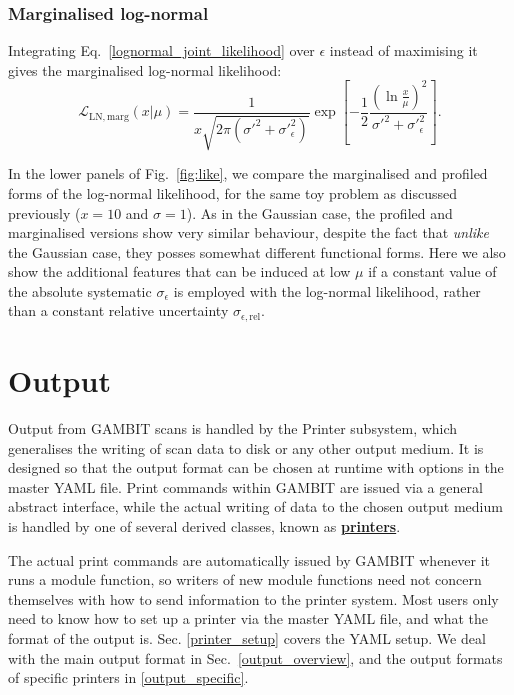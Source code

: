 \documentclass[pdftex,twocolumn,epjc3_preprint,runningheads]{svjour3}
\renewcommand{\_}{\discretionary{\underscore}{}{\underscore}}
\newcommand{\doublecross}[2]{\hyperref[#2]{\textbf{#1}}}
\newcommand{\gambit}{\textsf{GAMBIT}\xspace}
\newcommand{\GB}{\gambit}
\newcommand\YAML{\textsf{YAML}\xspace}
\begin{document}
\subsubsection{Marginalised log-normal}
Integrating Eq.\ \ref{lognormal_joint_likelihood} over $\epsilon$ instead of maximising it gives the marginalised log-normal likelihood:
\begin{equation}
\label{lognormal_marg}
\mathcal{L}_\mathrm{LN,marg}(x|\mu) = \frac{1}{x\sqrt{2\pi(\sigma'^2 + \sigma'^2_\epsilon)}} \exp\left[-\frac12\frac{(\ln \frac{x}{\mu} )^2}{\sigma'^2 + \sigma'^2_\epsilon}\right].
\end{equation}

In the lower panels of Fig.\ \ref{fig:like}, we compare the marginalised and profiled forms of the log-normal likelihood, for the same toy problem as discussed previously ($x=10$ and $\sigma=1$).  As in the Gaussian case, the profiled and marginalised versions show very similar behaviour, despite the fact that \textit{unlike} the Gaussian case, they posses somewhat different functional forms.  Here we also show the additional features that can be induced at low $\mu$ if a constant value of the absolute systematic $\sigma_\epsilon$ is employed with the log-normal likelihood, rather than a constant relative uncertainty $\sigma_{\epsilon,\mathrm{rel}}$.

\section{Output}
\label{printers}

Output from \GB scans is handled by the Printer subsystem, which generalises the writing of scan data to disk or any other output medium.  It is designed so that the output format can be chosen at runtime with options in the master \YAML file. Print commands within \GB are issued via a general abstract interface, while the actual writing of data to the chosen output medium is handled by one of several derived classes, known as \doublecross{printers}{printer}.

The actual print commands are automatically issued by \GB whenever it runs a module function, so writers of new module functions need not concern themselves with how to send information to the printer system.  Most users only need to know how to set up a printer via the master \YAML file, and what the format of the output is.  Sec. \ref{printer_setup} covers the \YAML setup.  We deal with the main output format in Sec.\ \ref{output_overview}, and the output formats of specific printers in \ref{output_specific}.
\end{document}
